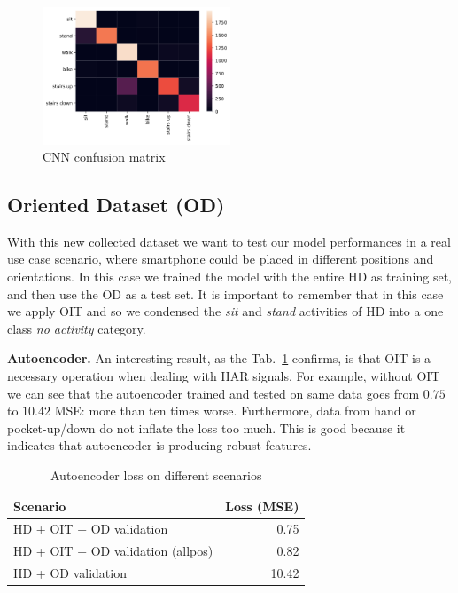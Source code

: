 \vspace{-0.2cm}
\begin{figure}[h]
	\centering
	\includegraphics[width=0.5\textwidth]{images/confusion_matrix.png}
	\caption{CNN confusion matrix}
	\label{fig:cnn-confusion-matrix}
\end{figure}

\vspace{-0.3cm}

\subsection{Oriented Dataset (OD)}

With this new collected dataset we want to test our model performances
in a real use case scenario, where smartphone could be placed in
different positions and orientations. In this case we trained the
model with the entire HD as training set, and then use the OD as a
test set. It is important to remember that in this case we apply OIT
and so we condensed the \textit{sit} and \textit{stand} activities of
HD into a one class \textit{no activity} category.

\textbf{Autoencoder.}  An interesting result, as the
Tab.~\ref{tab:ae-loss} confirms, is that OIT is a necessary operation
when dealing with HAR signals. For example, without OIT we can see
that the autoencoder trained and tested on same data goes from $0.75$
to $10.42$ MSE: more than ten times worse. Furthermore, data from
hand or pocket-up/down do not inflate the loss too much. This is good
because it indicates that autoencoder is producing robust features.

\begin{table}[t]
  \centering
  \begin{tabular}{lr}
    \hline
    Scenario & Loss (MSE) \\
    \hline
    HD + OIT + OD validation & 0.75 \\
    HD + OIT + OD validation (allpos) & 0.82 \\
    HD + OD validation & 10.42 \\
    \hline
  \end{tabular}
  \caption{Autoencoder loss on different scenarios}
  \label{tab:ae-loss}
\end{table}

